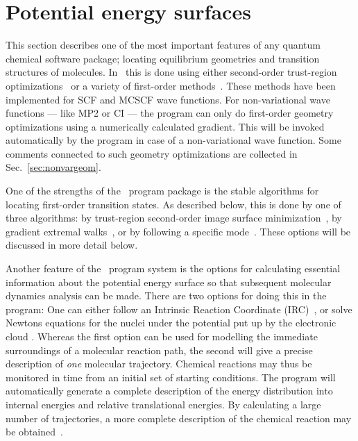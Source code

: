 \chapter{Potential energy surfaces}\label{ch:geometrywalks}

This section describes one of the most important features of any
quantum chemical software package; locating equilibrium
geometries and
transition structures of molecules. In
\siraba\ this is done using either
second-order trust-region 
optimizations~\cite{tuhjahjajpjjcp84} or a
variety of first-order
methods~\cite{Fletcher}. These methods
have been implemented for SCF and MCSCF wave functions. For
non-variational wave functions --- like MP2 or CI --- the program can
only do first-order geometry optimizations using a
numerically
calculated gradient. This will be invoked automatically by the program
in case of a non-variational wave function. Some comments connected to
such geometry optimizations are collected in Sec.~\ref{sec:nonvargeom}.

One of the strengths of the \siraba\ program package is the
stable algorithms for locating first-order transition
states. As described below,
this is done by one of three algorithms: by trust-region
second-order image surface minimization~\cite{thcpl182}, by gradient extremal
walks~\cite{pjhjajthtca73}, or by following a
specific mode~\cite{hjajpjthjcp85}. These
options will be discussed in more detail below.

Another feature of the \siraba\ program system is the options for
calculating essential information about the potential energy
surface so that subsequent molecular dynamics analysis can be
made. There are two options for doing this in the program: One can
either follow an Intrinsic Reaction Coordinate
(IRC)~\cite{pjhjajthtca73}, or solve Newtons equations for the nuclei under the
potential put up by the electronic cloud
\cite{theuhjajcpl173}. Whereas the first option
can be used for modelling the immediate surroundings of a
molecular reaction path, the second will give a precise
description of {\em one} molecular trajectory. Chemical reactions
may thus be monitored in time from an initial set of starting
conditions. The program will automatically generate a complete
description of the energy distribution into internal energies and
relative translational energies. By calculating a large number of
trajectories, a more complete description of the chemical reaction
may be obtained~\cite{rsgmtjdwrjbjcp106}.

